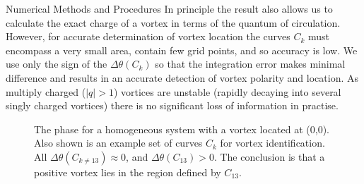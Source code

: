 \begin{chapter}{\label{cha:numerics}Numerical Methods and Procedures}
In principle the result also allows us to calculate the exact charge of a vortex in terms of the quantum of circulation. However, for accurate determination of vortex location the curves $C_k$ must encompass a very small area, contain few grid points, and so accuracy is low. We use only the sign of the $\Delta\theta(C_k)$ so that the integration error makes minimal difference and results in an accurate detection of vortex polarity and location. As multiply charged ($|q|>1$) vortices are unstable (rapidly decaying into several singly charged vortices) there is no significant loss of information in practise.
\begin{figure}
  \centering
  \caption{The phase for a homogeneous system with a vortex located at (0,0). Also shown is an example set of curves $C_k$ for vortex identification. All $\Delta\theta(C_{k\neq13})\approx0$, and $\Delta\theta(C_{13})>0$. The conclusion is that a positive vortex lies in the region defined by $C_{13}$.}
 \end{figure}

\end{chapter}
